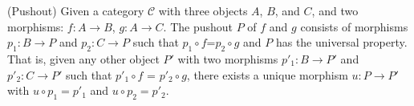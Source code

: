 \begin{definition}  (Pushout) Given a category $\mathcal{C}$ with three objects $A$, $B$, and $C$, and two morphisms: $f: A \to B$, $g: A \to C$. The pushout $P$ of $f$ and $g$ consists of morphisms $p_1: B \to P$  and $p_2: C \to P$ such that $p_1 \circ f$=$p_2 \circ g$  and $P$ has the universal property. That is, given any other object $P'$ with two morphisms $p'_1: B \to P'$  and $p'_2: C \to P'$ such that $p'_1 \circ f$ = $p'_2 \circ g$, there exists a unique morphism $u: P \to  P'$ with $u \circ p_1 = p'_1$ and  $u \circ p_2 = p'_2$.







\end{definition}







